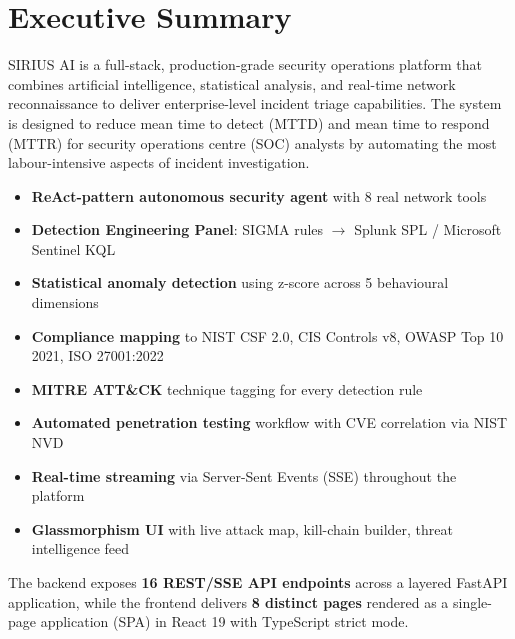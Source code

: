 \documentclass[12pt,a4paper]{article}
\begin{document}
\tableofcontents
\newpage

\section{Executive Summary}

SIRIUS AI is a full-stack, production-grade security operations platform that combines
artificial intelligence, statistical analysis, and real-time network reconnaissance to
deliver enterprise-level incident triage capabilities. The system is designed to reduce
mean time to detect (MTTD) and mean time to respond (MTTR) for security operations centre
(SOC) analysts by automating the most labour-intensive aspects of incident investigation.

\begin{infobox}[title=Platform Highlights]
\begin{itemize}[noitemsep]
  \item \textbf{ReAct-pattern autonomous security agent} with 8 real network tools
  \item \textbf{Detection Engineering Panel}: SIGMA rules $\rightarrow$ Splunk SPL / Microsoft Sentinel KQL
  \item \textbf{Statistical anomaly detection} using z-score across 5 behavioural dimensions
  \item \textbf{Compliance mapping} to NIST CSF 2.0, CIS Controls v8, OWASP Top 10 2021, ISO 27001:2022
  \item \textbf{MITRE ATT\&CK} technique tagging for every detection rule
  \item \textbf{Automated penetration testing} workflow with CVE correlation via NIST NVD
  \item \textbf{Real-time streaming} via Server-Sent Events (SSE) throughout the platform
  \item \textbf{Glassmorphism UI} with live attack map, kill-chain builder, threat intelligence feed
\end{itemize}
\end{infobox}

The backend exposes \textbf{16 REST/SSE API endpoints} across a layered FastAPI application,
while the frontend delivers \textbf{8 distinct pages} rendered as a single-page application (SPA)
in React 19 with TypeScript strict mode.
\end{document}

